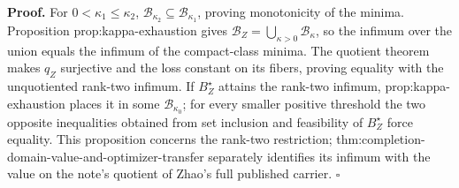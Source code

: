 \textbf{Proof.}
For \(0<\kappa_1\le\kappa_2\), \(\mathcal B_{\kappa_2}\subseteq\mathcal B_{\kappa_1}\), proving monotonicity of the minima.  Proposition prop:kappa-exhaustion gives \(\mathcal B_Z=\bigcup_{\kappa>0}\mathcal B_\kappa\), so the infimum over the union equals the infimum of the compact-class minima.  The quotient theorem makes \(q_Z\) surjective and the loss constant on its fibers, proving equality with the unquotiented rank-two infimum.  If \(B_Z^\star\) attains the rank-two infimum, prop:kappa-exhaustion places it in some \(\mathcal B_{\kappa_0}\); for every smaller positive threshold the two opposite inequalities obtained from set inclusion and feasibility of \(B_Z^\star\) force equality.  This proposition concerns the rank-two restriction; thm:completion-domain-value-and-optimizer-transfer separately identifies its infimum with the value on the note's quotient of Zhao's full published carrier. \(\square\)